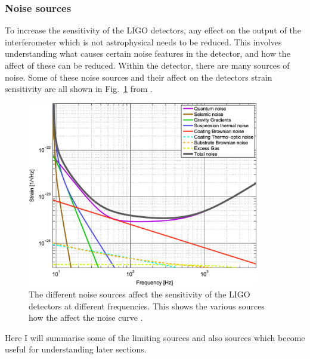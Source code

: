 \subsubsection{\label{intro:detector:noise}Noise sources}

To increase the sensitivity of the \ac{LIGO} detectors, any effect on the output of the interferometer which is not astrophysical needs to be reduced.
This involves understanding what causes certain noise features in the detector, and how the affect of these can be reduced. 
Within the detector, there are many sources of noise.
Some of these noise sources and their affect on the detectors strain sensitivity are all shown in Fig.~\ref{detectors:noisesensitivity} from \citep{aasi2015AdvancedLIGO}.
\begin{figure}[h]
    \centering
    \includegraphics[width=0.9\textwidth]{C1_intro/noise_sensitivity.jpg}
    \caption{The different noise sources affect the sensitivity of the \ac{LIGO} detectors at different frequencies. This shows the various sources how the affect the noise curve \citep{aasi2015AdvancedLIGO}.}
    \label{detectors:noisesensitivity}
\end{figure}
Here I will summarise some of the limiting sources and also sources which become useful for understanding later sections.

